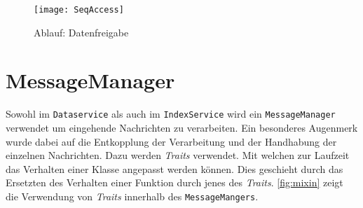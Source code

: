 
    \begin{figure}[H]
    \centering
    \texttt{[image: SeqAccess]}
    \caption{Ablauf: Datenfreigabe}
    \label{fig:seqaccesssession}
    \end{figure}


\section{MessageManager}\label{message-manager}

Sowohl im \texttt{Dataservice} als auch im \texttt{IndexService} wird ein \texttt{MessageManager} verwendet um eingehende Nachrichten zu verarbeiten. Ein besonderes Augenmerk wurde dabei auf die Entkopplung der Verarbeitung und der Handhabung der einzelnen Nachrichten. Dazu werden \textit{Traits} verwendet. Mit welchen zur Laufzeit das Verhalten einer Klasse angepasst werden können. Dies geschieht durch das Ersetzten des Verhalten einer Funktion durch jenes des \textit{Traits}. \autoref{fig:mixin} zeigt die Verwendung von \textit{Traits} innerhalb des \texttt{MessageMangers}.

